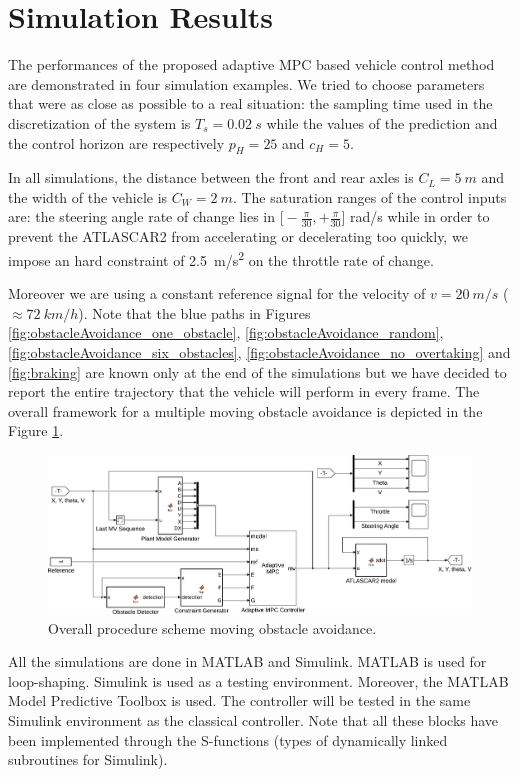 \section{Simulation Results}
The performances of the proposed adaptive MPC based vehicle control method are demonstrated in four simulation examples. We tried to choose parameters that were as close as possible to a real situation: the sampling time used in the discretization of the system is $T_s=\SI{0.02}{s}$ while the values of the prediction and the control horizon are respectively $p_H=25$ and $c_H=5$. 

In all simulations, the distance between the front and rear axles is $C_L=\SI{5}{m}$ and the width of the vehicle is $C_W=\SI{2}{m}$. The saturation ranges of the control inputs are: the steering angle rate of change lies in $\big[-\frac{\pi}{30}, +\frac{\pi}{30}\big]$ rad/s while in order to prevent the ATLASCAR2 from accelerating or decelerating too quickly, we impose an hard constraint of \SI{2.5}{m/s^2} on the throttle rate of change.

Moreover we are using a constant reference signal for the velocity of $v=\SI{20}{m/s}$ ($\approx\SI{72}{km/h}$).
Note that the blue paths in Figures \ref{fig:obstacleAvoidance_one_obstacle}, \ref{fig:obstacleAvoidance_random}, 	\ref{fig:obstacleAvoidance_six_obstacles}, \ref{fig:obstacleAvoidance_no_overtaking} and \ref{fig:braking} are known only at the end of the simulations but we have decided to report the entire trajectory that the vehicle will perform in every frame. The overall framework for a multiple moving obstacle avoidance is depicted in the Figure \ref{fig:MovingObstacleAvoidance}.
\begin{figure}[!h]
	\centering
	\includegraphics[width=\textwidth]{./figure/MovingObstacleAvoidance.pdf}
	\caption{Overall procedure scheme moving obstacle avoidance.}
	\label{fig:MovingObstacleAvoidance}
\end{figure}

All the simulations are done in MATLAB and Simulink. MATLAB is used for loop-shaping. Simulink is used as a testing environment.  Moreover, the MATLAB Model Predictive Toolbox is used. The controller will be tested in the same Simulink environment as the classical controller. Note that all these blocks have been implemented through the S-functions (types of dynamically linked subroutines for Simulink).


